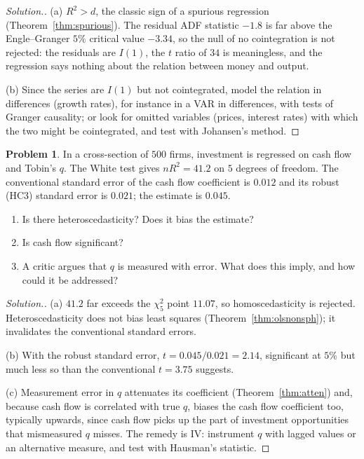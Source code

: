 \documentclass[11pt,a4paper]{article}
\numberwithin{equation}{section}
\theoremstyle{definition}
\newtheorem{problemx}{Problem}[subsection]
\newenvironment{problem}{\begin{problemx}}{\end{problemx}}
\newenvironment{solution}
  {\renewcommand{\qedsymbol}{}\begin{proof}[\textit{Solution}.]}
  {\end{proof}}
\begin{document}
\begin{solution}
(a) $R^2 > d$, the classic sign of a spurious regression (Theorem~\ref{thm:spurious}). The residual ADF statistic $-1.8$ is far above the Engle--Granger $5\%$ critical value $-3.34$, so
the null of no cointegration is not rejected: the residuals are $I(1)$, the $t$ ratio of $34$ is meaningless, and the regression says nothing about the relation
between money and output.

(b) Since the series are $I(1)$ but not cointegrated, model the relation in differences (growth rates), for instance in a VAR in differences, with
tests of Granger causality; or look for omitted variables (prices, interest rates) with which the two might be cointegrated, and test with Johansen's
method.
\end{solution}

\begin{problem}
In a cross-section of $500$ firms, investment is regressed on cash flow and Tobin's $q$. The White test gives $nR^2 = 41.2$ on $5$ degrees of freedom. The
conventional standard error of the cash flow coefficient is $0.012$ and its robust (HC3) standard error is $0.021$; the estimate is $0.045$.
\begin{enumerate}[label=(\alph*)]
\item Is there heteroscedasticity? Does it bias the estimate?
\item Is cash flow significant?
\item A critic argues that $q$ is measured with error. What does this imply, and how could it be addressed?
\end{enumerate}
\end{problem}

\begin{solution}
(a) $41.2$ far exceeds the $\chi^2_5$ point $11.07$, so homoscedasticity is rejected. Heteroscedasticity does not bias least squares (Theorem~\ref{thm:olsnonsph}); it invalidates the
conventional standard errors.

(b) With the robust standard error, $t = 0.045/0.021 = 2.14$, significant at $5\%$ but much less so than the conventional $t = 3.75$ suggests.

(c) Measurement error in $q$ attenuates its coefficient (Theorem~\ref{thm:atten}) and, because cash flow is correlated with true $q$, biases the cash flow coefficient
too, typically upwards, since cash flow picks up the part of investment opportunities that mismeasured $q$ misses. The remedy is IV: instrument $q$
with lagged values or an alternative measure, and test with Hausman's statistic.
\end{solution}
\end{document}
